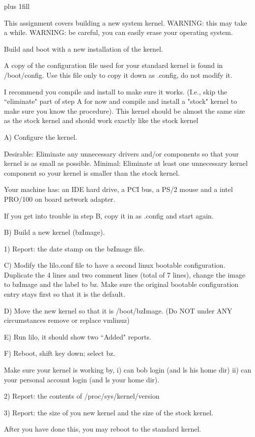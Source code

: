 
\rightskip=0pt plus 1fill

\parindent 0pt

This assignment covers building a new system kernel.
WARNING: this may take a while.
WARNING: be careful, you can easily erase your operating system.

Build and boot with a new installation of the kernel.

A copy of the configuration file used for your standard kernel
is found in {\ltt{}/boot/config}. Use this file only
to copy it down as {\ltt{}.config}, do not modify it.

I recommend you compile and install to make sure it works.
(I.e., skip the ``eliminate" part of step A for now and compile and
install a "stock" kernel to
make sure you know the procedure).
This kernel should be almost the same size as the stock kernel and should
work exactly like the stock kernel

A) Configure the kernel. 

Desirable:
Eliminate any unnecessary drivers and/or components so that your kernel is
as small as possible.
Minimal: Eliminate at least one unnecessary kernel component so your kernel
is smaller than the stock kernel.


Your machine has:
an IDE hard drive, a PCI bus, a PS/2 mouse
and
a intel PRO/100 on board network adapter.

If you get into trouble in step B, copy it in as {\ltt{}.config}
and start again.

B) Build a new kernel ({\ltt{}bzImage}).

1) Report: the date stamp on the bzImage file.

C) Modify the {\ltt{}lilo.conf} file to have a second linux
bootable configuration.
Duplicate the 4 lines and two comment lines (total of 7 lines),
change the image to {\ltt{}bzImage} and the label to {\ltt{}bz}.
Make sure the original bootable configuration entry stays first so that
it is the default.

D) Move the new kernel so that it is {\ltt{}/boot/bzImage}.
(Do NOT under ANY circumstances remove or replace {\ltt{}vmlinuz})

E) Run lilo, it should show two ``Added" reports.

F) Reboot, shift key down; select bz.

Make sure your kernel is working by,
i) can bob login (and ls his home dir)
ii) can your personal account login (and ls your home dir). 

2) Report: the contents of {\ltt{}/proc/sys/kernel/version} 

3) Report: the size of you new kernel and the size of the stock kernel.

After you have done this, you may reboot to the standard kernel.
\bye
